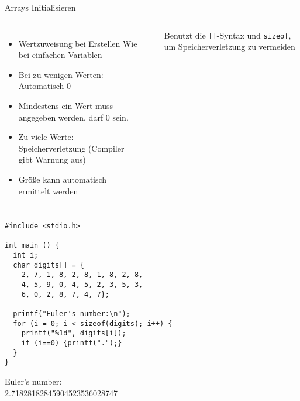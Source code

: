 \begin{frame}{Arrays Initialisieren}
%
\begin{columns}[T]
\begin{itemize}
\item Wertzuweisung bei Erstellen\newline
	Wie bei einfachen Variablen
\item Bei zu wenigen Werten: Automatisch 0
\item Mindestens ein Wert muss angegeben werden, darf 0 sein.
\item Zu viele Werte: Speicherverletzung (Compiler gibt Warnung aus)
\item Größe kann automatisch ermittelt werden
\end{itemize}
%
\begin{codebox}[Syntax]
\footnotesize {}
\footnotesize {}
\end{codebox}
%
\begin{hintbox}
Benutzt die \texttt{[]}-Syntax und \texttt{sizeof}, um Speicherverletzung zu vermeiden
\end{hintbox}
%
\end{columns}
%
\end{frame}


\begin{frame}[fragile]
%
%
\begin{codebox}
\begin{verbatim}
#include <stdio.h>

int main () {
  int i;
  char digits[] = {
    2, 7, 1, 8, 2, 8, 1, 8, 2, 8, 
    4, 5, 9, 0, 4, 5, 2, 3, 5, 3, 
    6, 0, 2, 8, 7, 4, 7};
  
  printf("Euler's number:\n");
  for (i = 0; i < sizeof(digits); i++) {	
    printf("%1d", digits[i]);
    if (i==0) {printf(".");}
  }
}
\end{verbatim}
\end{codebox}%
%
%
\begin{cmdbox}[Ausgabe]
Euler's number:\\
2.71828182845904523536028747
\end{cmdbox}
%
\end{frame}

